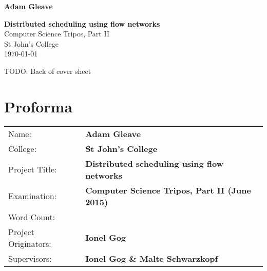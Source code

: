 \documentclass[12pt,a4paper,twoside,notitlepage]{report}
\theoremstyle{definition}
\begin{document}

\pagestyle{empty}

\hfill{\large \bf Adam Gleave}

\vspace*{30mm}

\begin{center}
	\LARGE{\textbf{Distributed scheduling using flow networks}} \hspace*{\fill} \\

	\vspace*{5mm}
	Computer Science Tripos, Part II \\
	\vspace*{5mm}
	St John's College \\
	\vspace*{5mm}
	\today
\end{center}
\clearpage
\vspace*{\fill}

TODO: Back of cover sheet

\vspace*{\fill}


\setcounter{page}{1}
\pagestyle{plain}
\chapter*{Proforma}
\vspace*{-2em}
{
	\begin{tabular}{ll}
		Name:			& \textbf{Adam Gleave}					\\
		College:		& \textbf{St John's College}\\
    Project Title:	& \textbf{Distributed scheduling using flow networks}\\
		Examination:	& \textbf{Computer Science Tripos, Part II (June 2015)}\\
    Word Count:		& \textbf{ \unskip}\\
		Project Originators:	& \textbf{Ionel Gog}\\
    Supervisors:	& \textbf{Ionel Gog \& Malte Schwarzkopf}\\
	\end{tabular}
}

\renewcommand{\arraystretch}{1.3}
\vspace*{-1em}
\end{document}
